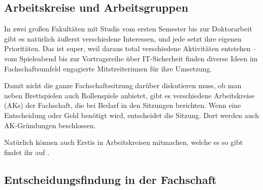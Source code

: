 

\vspace*{-2mm}
\subsection{Arbeitskreise und Arbeitsgruppen}
In zwei großen Fakultäten mit Studis vom ersten Semester bis zur Doktorarbeit gibt es natürlich äußerst verschiedene Interessen, und jede setzt ihre eigenen Prioritäten. Das ist super, weil daraus total verschiedene Aktivitäten entstehen -- vom Spieleabend bis zur Vortragsreihe über IT-Sicherheit finden diverse Ideen im Fachschaftsumfeld engagierte Mitstreiterinnen für ihre Umsetzung.

Damit nicht die ganze Fachschaftssitzung darüber diskutieren muss, ob man neben Brettspielen auch Rollenspiele anbietet, gibt es verschiedene Arbeitskreise (AKs) der Fachschaft, die bei Bedarf in den Sitzungen berichten. Wenn eine Entscheidung oder Geld benötigt wird, entscheidet die Sitzung. Dort werden auch AK-Gründungen beschlossen.

Natürlich können auch Erstis in Arbeitskreisen mitmachen, welche es so gibt findet ihr auf .







\vspace*{-2mm}
\subsection{Entscheidungsfindung in der Fachschaft}

